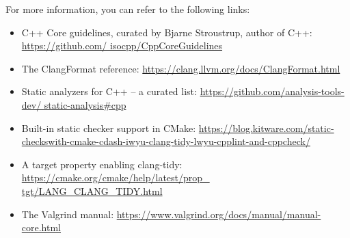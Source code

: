 
For more information, you can refer to the following links:

\begin{itemize}
\item
C++ Core guidelines, curated by Bjarne Stroustrup, author of C++: \url{https://github.com/ isocpp/CppCoreGuidelines}

\item
The ClangFormat reference: \url{https://clang.llvm.org/docs/ClangFormat.html}

\item
Static analyzers for C++ – a curated list: \url{https://github.com/analysis-tools-dev/ static-analysis#cpp}

\item
Built-in static checker support in CMake: \url{https://blog.kitware.com/static-checkswith-cmake-cdash-iwyu-clang-tidy-lwyu-cpplint-and-cppcheck/}

\item
A target property enabling clang-tidy: \url{https://cmake.org/cmake/help/latest/prop_ tgt/LANG_CLANG_TIDY.html}

\item
The Valgrind manual: \url{https://www.valgrind.org/docs/manual/manual-core.html}
\end{itemize}